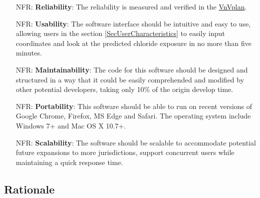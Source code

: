 \documentclass[12pt]{article}
\newcounter{nfrnum} %
\begin{document}
\noindent \begin{itemize}

\item[NFR\refstepcounter{nfrnum}\thenfrnum \label{NFR_Reliability}:]   \textbf{Reliability}: The reliability is measured and verified in the \href{https://github.com/CynthiaLiu0805/BridgeCorrosion/blob/main/docs/VnVPlan/VnVPlan.pdf}{VnVplan}.

\item[NFR\refstepcounter{nfrnum}\thenfrnum \label{NFR_Usability}:] \textbf{Usability}: The software interface should be intuitive and easy to use, allowing users in the section \ref{SecUserCharacteristics} to easily input coordinates and look at the predicted chloride exposure in no more than five minutes.

\item[NFR\refstepcounter{nfrnum}\thenfrnum \label{NFR_Maintainability}:] \textbf{Maintainability}: The code for this software should be designed and structured in a way that it could be easily comprehended and modified by other potential developers, taking only 10\% of the origin develop time.

\item[NFR\refstepcounter{nfrnum}\thenfrnum \label{NFR_Portability}:]  \textbf{Portability}: This software should be able to run on recent versions of Google Chrome, Firefox, MS Edge and Safari. The operating system include Windows 7+ and Mac OS X 10.7+.

\item[NFR\refstepcounter{nfrnum}\thenfrnum \label{NFR_Scalability}:]   \textbf{Scalability}: The software should be scalable to accommodate potential future expansions to more jurisdictions, support concurrent users while maintaining a quick response time.
\end{itemize}

\subsection{Rationale}
\end{document}
